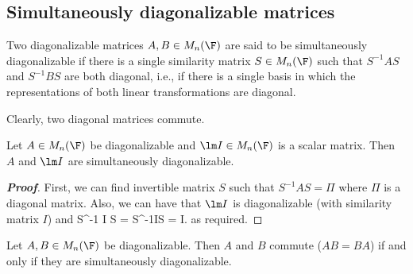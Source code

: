 \subsection{Simultaneously diagonalizable matrices}

\begin{definition}\label{def:simultaneously_diagonalizable_matrices}
Two diagonalizable matrices $A,B\in M_n(\F)$ are said to be simultaneously diagonalizable if there is a single similarity matrix $S\in M_n(\F)$ such that $S^{-1}AS$ and  $S^{-1}BS$ are both
diagonal, i.e., if there is a single basis in which the representations of both linear transformations are diagonal.
\end{definition}

\begin{remark}
Clearly, two diagonal matrices commute.
\end{remark}

\begin{lemma}\label{lem:scalar_matrix_and_any_diagonalizable_matrix_are_simultaneously_diagonalizable}
Let $A\in M_n(\F)$ be diagonalizable and $\lm I\in M_n(\F)$ is a scalar matrix. Then $A$ and $\lm I$ are simultaneously diagonalizable.
\end{lemma}

\begin{proof}[\bf Proof]
First, we can find invertible matrix $S$ such that $S^{-1}AS = \Pi$ where $\Pi$ is a diagonal matrix. Also, we can have that $\lm I$ is diagonalizable (with similarity matrix $I$) and
\be
S^{-1} \lm I S = \lm S^{-1}IS = \lm I.
\ee
as required.
\end{proof}

\begin{theorem}\label{thm:diagonalizable_matrices_commute_iff_simultaneously diagonalizable}
Let $A,B\in M_n(\F)$ be diagonalizable. Then $A$ and $B$ commute ($AB = BA$) if and only if they are simultaneously diagonalizable.
\end{theorem}

